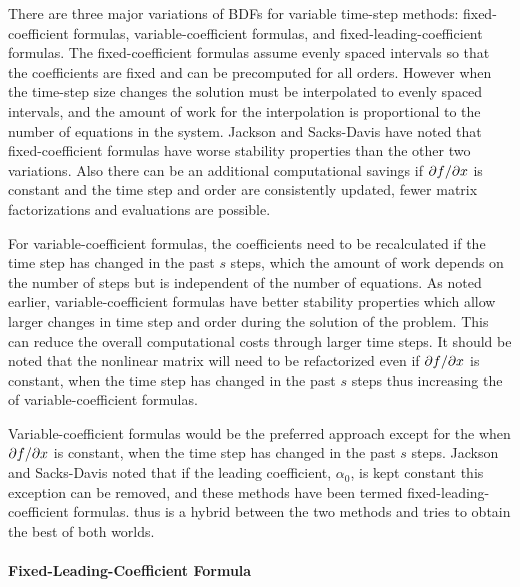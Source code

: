 There are three major variations of BDFs for variable time-step methods:
fixed-coefficient formulas, variable-coefficient formulas, and fixed-leading-coefficient
formulas. The fixed-coefficient formulas assume evenly spaced intervals
so that the coefficients are fixed and can be precomputed for all
orders\cite[p. 130]{AscherPetzold}. However when the time-step size
changes the solution must be interpolated to evenly spaced intervals,
and the amount of work for the interpolation is proportional to the
number of equations in the system. Jackson and Sacks-Davis\cite{Jackson1980}
have noted that fixed-coefficient formulas have worse stability properties
than the other two variations. Also there can be an additional computational
savings if $\partial f / \partial x$ is constant and the time step and order are
consistently updated, fewer matrix factorizations and evaluations
are possible.

For variable-coefficient formulas, the coefficients need to be recalculated
if the time step has changed in the past $s$ steps, which the amount
of work depends on the number of steps but is independent of the number
of equations. As noted earlier, variable-coefficient formulas have
better stability properties which allow larger changes in time step
and order during the solution of the problem. This can reduce the
overall computational costs through larger time steps. It should be
noted that the nonlinear matrix will need to be refactorized even
if $\partial f / \partial x$ is constant, when the time step has changed in the
past $s$ steps thus increasing the of variable-coefficient formulas.

Variable-coefficient formulas would be the preferred approach except
for the when $\partial f / \partial x$ is constant, when the time step has changed
in the past $s$ steps. Jackson and Sacks-Davis\cite{Jackson1980}
noted that if the leading coefficient, $\alpha_{0}$, is kept constant
this exception can be removed, and these methods have been termed
fixed-leading-coefficient formulas. thus is a hybrid between the two
methods and tries to obtain the best of both worlds.

\paragraph*{Fixed-Leading-Coefficient Formula\cite{BDF-FLC}}

